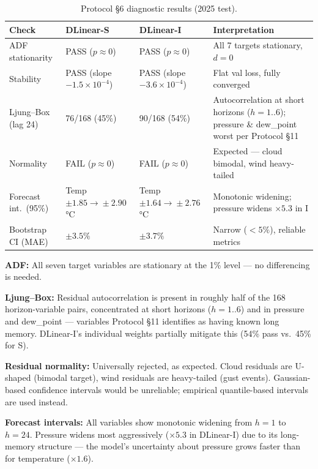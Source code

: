 \begin{table}[H]
\centering
\caption{Protocol \S6 diagnostic results (2025 test).}
\small
\begin{tabular}{l p{2.3cm} p{2.3cm} p{5.2cm}}
\toprule
\textbf{Check} & \textbf{DLinear-S} & \textbf{DLinear-I} &
\textbf{Interpretation} \\
\midrule
ADF stationarity
  & PASS ($p\approx 0$)
  & PASS ($p\approx 0$)
  & All 7 targets stationary, $d=0$ \\
Stability
  & PASS (slope $-1.5\!\times\!10^{-4}$)
  & PASS (slope $-3.6\!\times\!10^{-4}$)
  & Flat val loss, fully converged \\
Ljung--Box (lag 24)
  & 76/168 (45\%)
  & 90/168 (54\%)
  & Autocorrelation at short horizons ($h=1..6$); pressure
    \& dew\_point worst per Protocol \S11 \\
Normality
  & FAIL ($p\approx 0$)
  & FAIL ($p\approx 0$)
  & Expected --- cloud bimodal, wind heavy-tailed \\
Forecast int.\ (95\%)
  & Temp $\pm 1.85\!\to\!\pm 2.90$\,°C
  & Temp $\pm 1.64\!\to\!\pm 2.76$\,°C
  & Monotonic widening; pressure widens $\times 5.3$ in I \\
Bootstrap CI (MAE)
  & $\pm 3.5\%$
  & $\pm 3.7\%$
  & Narrow ($<5\%$), reliable metrics \\
\bottomrule
\end{tabular}
\end{table}

\textbf{ADF:} All seven target variables are stationary at the 1\% level --- no
differencing is needed.

\textbf{Ljung--Box:} Residual autocorrelation is present in roughly half of the
168 horizon-variable pairs, concentrated at short horizons ($h=1..6$) and in
pressure and dew\_point --- variables Protocol \S11 identifies as having known
long memory. DLinear-I's individual weights partially mitigate this (54\% pass
vs.\ 45\% for S).

\textbf{Residual normality:} Universally rejected, as expected. Cloud residuals
are U-shaped (bimodal target), wind residuals are heavy-tailed (gust events).
Gaussian-based confidence intervals would be unreliable; empirical quantile-based
intervals are used instead.

\textbf{Forecast intervals:} All variables show monotonic widening from $h=1$ to
$h=24$. Pressure widens most aggressively ($\times 5.3$ in DLinear-I) due to its
long-memory structure --- the model's uncertainty about pressure grows faster
than for temperature ($\times 1.6$).

